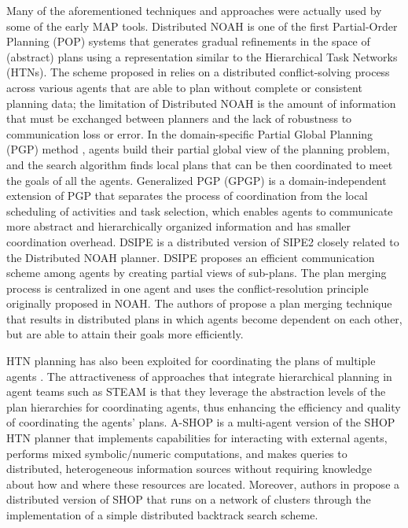 \documentclass[12pt]{article}
\begin{document}
Many of the aforementioned techniques and approaches were actually used by some of the early MAP tools.
Distributed NOAH \cite{10.5555/1624861.1624903} is one of the first Partial-Order Planning (POP) systems that generates gradual refinements in the space of (abstract) plans using a representation similar to the Hierarchical Task Networks (HTNs).
The scheme proposed in \cite{10.5555/1624861.1624903} relies on a distributed conflict-solving process across various agents that are able to plan without complete or consistent planning data; the limitation of Distributed NOAH is the amount of information that must be exchanged between planners and the lack of robustness to communication loss or error.
In the domain-specific Partial Global Planning (PGP) method \cite{120067}, agents build their partial global view of the planning problem, and the search algorithm finds local plans that can be then coordinated to meet the goals of all the agents.
Generalized PGP (GPGP) is a domain-independent extension of PGP \cite{decker_lesser_1992} that separates the process of coordination from the local scheduling of activities and task selection, which enables agents to communicate more abstract and hierarchically organized information and has smaller coordination overhead.
DSIPE \cite{desJardins1999CoordinatingAD} is a distributed version of SIPE2 \cite{10.5555/52077} closely related to the Distributed NOAH planner.
DSIPE proposes an efficient communication scheme among agents by creating partial views of sub-plans.
The plan merging process is centralized in one agent and uses the conflict-resolution principle originally proposed in NOAH.
The authors of \cite{deWeerdt2003} propose a plan merging technique that results in distributed plans in which agents become dependent on each other, but are able to attain their goals more efficiently.

HTN planning has also been exploited for coordinating the plans of multiple agents \cite{Clement1999TheoryFC}.
The attractiveness of approaches that integrate hierarchical planning in agent teams such as STEAM \cite{Tambe1997TowardsFT} is that they leverage the abstraction levels of the plan hierarchies for coordinating agents, thus enhancing the efficiency and quality of coordinating the agents’ plans.
A-SHOP \cite{Dix2003IMPACTingSP} is a multi-agent version of the SHOP HTN planner \cite{Nau_2003} that implements capabilities for interacting with external agents, performs mixed symbolic/numeric computations, and makes queries to distributed, heterogeneous information sources without requiring knowledge about how and where these resources are located.
Moreover, authors in \cite{Kabanza2005DISTRIBUTEDHT} propose a distributed version of SHOP that runs on a network of clusters through the implementation of a simple distributed backtrack search scheme.
\end{document}
